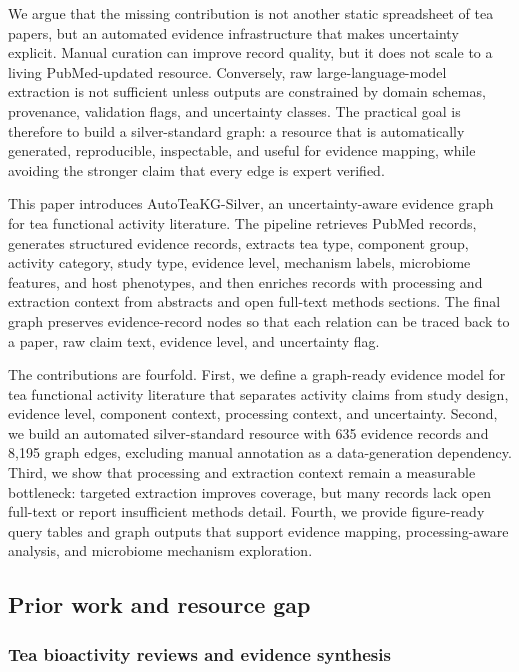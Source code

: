 \documentclass[11pt]{article}
\begin{document}
We argue that the missing contribution is not another static spreadsheet of tea papers, but an automated evidence infrastructure that makes uncertainty explicit. Manual curation can improve record quality, but it does not scale to a living PubMed-updated resource. Conversely, raw large-language-model extraction is not sufficient unless outputs are constrained by domain schemas, provenance, validation flags, and uncertainty classes. The practical goal is therefore to build a silver-standard graph: a resource that is automatically generated, reproducible, inspectable, and useful for evidence mapping, while avoiding the stronger claim that every edge is expert verified.

This paper introduces AutoTeaKG-Silver, an uncertainty-aware evidence graph for tea functional activity literature. The pipeline retrieves PubMed records, generates structured evidence records, extracts tea type, component group, activity category, study type, evidence level, mechanism labels, microbiome features, and host phenotypes, and then enriches records with processing and extraction context from abstracts and open full-text methods sections. The final graph preserves evidence-record nodes so that each relation can be traced back to a paper, raw claim text, evidence level, and uncertainty flag.

The contributions are fourfold. First, we define a graph-ready evidence model for tea functional activity literature that separates activity claims from study design, evidence level, component context, processing context, and uncertainty. Second, we build an automated silver-standard resource with 635 evidence records and 8,195 graph edges, excluding manual annotation as a data-generation dependency. Third, we show that processing and extraction context remain a measurable bottleneck: targeted extraction improves coverage, but many records lack open full-text or report insufficient methods detail. Fourth, we provide figure-ready query tables and graph outputs that support evidence mapping, processing-aware analysis, and microbiome mechanism exploration.

\subsection{Prior work and resource gap}

\subsubsection{Tea bioactivity reviews and evidence synthesis}
\end{document}
